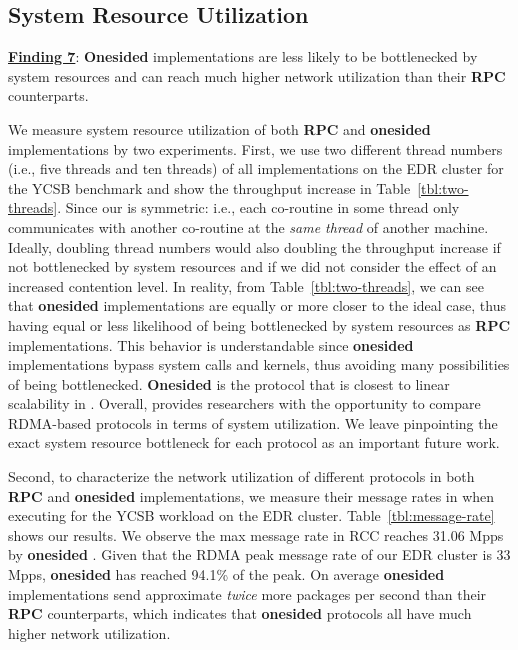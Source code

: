 \vspace{-2mm}
\subsection{System Resource Utilization}

\underline{\bf Finding 7}: \textbf{Onesided} implementations are less likely to be bottlenecked by system resources and can reach much higher network utilization than their \textbf{RPC} counterparts.

We measure system resource utilization of both \textbf{RPC} and \textbf{onesided} implementations by two experiments. First, we use two different thread numbers (i.e., five threads and ten threads) of all implementations on the EDR cluster for the YCSB benchmark and show the throughput increase in Table~\ref{tbl:two-threads}. Since our \projectname is symmetric: i.e., each co-routine in some thread only communicates with another co-routine at the {\em same thread} of another machine. Ideally, doubling thread numbers would also doubling the throughput increase if not bottlenecked by system resources and if we did not consider the effect of an increased contention level. In reality, from Table~\ref{tbl:two-threads}, we can see that \textbf{onesided} implementations are equally or more closer to the ideal case, thus having equal or less likelihood of being bottlenecked by system resources as \textbf{RPC} implementations. This behavior is understandable since \textbf{onesided} implementations bypass system calls and kernels, thus avoiding many possibilities of being bottlenecked. \textbf{Onesided} \sundial is the protocol that is closest to linear scalability in \projectname. Overall, \projectname provides researchers with the opportunity to compare RDMA-based protocols in terms of system utilization. We leave pinpointing the exact system resource bottleneck for each protocol as an important future work.

Second, to characterize the network utilization of different protocols in both \textbf{RPC} and \textbf{onesided} implementations, we measure their message rates in \projectname when executing for the YCSB workload on the EDR cluster. Table~\ref{tbl:message-rate} shows our results. We observe the max message rate in RCC reaches 31.06 Mpps by \textbf{onesided} \nowait. Given that the RDMA peak message rate of our {EDR} cluster is 33 Mpps, \textbf{onesided} \nowait has reached 94.1\% of the peak. On average \textbf{onesided} implementations send approximate {\em twice} more packages per second than their \textbf{RPC} counterparts, which indicates that \textbf{onesided} protocols all have much higher network utilization. 




